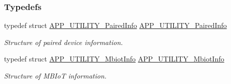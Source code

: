 \subsubsection*{Typedefs}
\begin{DoxyCompactItemize}
\item 
typedef struct \hyperlink{struct_a_p_p___u_t_i_l_i_t_y___paired_info}{A\+P\+P\+\_\+\+U\+T\+I\+L\+I\+T\+Y\+\_\+\+Paired\+Info} \hyperlink{group___u_t_i_l_i_t_y_ga17f3b36a88cd4cb1a9ad302eea064ba7}{A\+P\+P\+\_\+\+U\+T\+I\+L\+I\+T\+Y\+\_\+\+Paired\+Info}\hypertarget{group___u_t_i_l_i_t_y_ga17f3b36a88cd4cb1a9ad302eea064ba7}{}\label{group___u_t_i_l_i_t_y_ga17f3b36a88cd4cb1a9ad302eea064ba7}

\begin{DoxyCompactList}\small\item\em Structure of paired device information. \end{DoxyCompactList}\item 
typedef struct \hyperlink{struct_a_p_p___u_t_i_l_i_t_y___mbiot_info}{A\+P\+P\+\_\+\+U\+T\+I\+L\+I\+T\+Y\+\_\+\+Mbiot\+Info} \hyperlink{group___u_t_i_l_i_t_y_gaaa78fbb063cf3a7bf7ef65ea13069717}{A\+P\+P\+\_\+\+U\+T\+I\+L\+I\+T\+Y\+\_\+\+Mbiot\+Info}\hypertarget{group___u_t_i_l_i_t_y_gaaa78fbb063cf3a7bf7ef65ea13069717}{}\label{group___u_t_i_l_i_t_y_gaaa78fbb063cf3a7bf7ef65ea13069717}

\begin{DoxyCompactList}\small\item\em Structure of M\+B\+IoT information. \end{DoxyCompactList}\end{DoxyCompactItemize}
